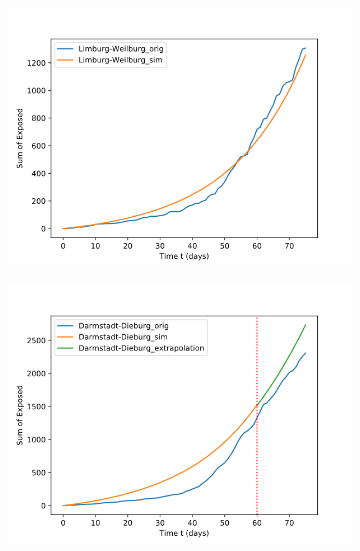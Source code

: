 \begin{figure}[h]
\begin{subfigure}[b]{0.3\textwidth}
		\includegraphics[width=\textwidth]{./figures/76d/10_Limburg-Weilburg.png}	
		\caption{}
	\end{subfigure}
	\begin{subfigure}[b]{0.3\textwidth}
		\centering
		\includegraphics[width=\textwidth]{./figures/60d/24_Darmstadt-Dieburg.png}	
		\caption{}
	\end{subfigure}
	\hfill
	\begin{subfigure}[b]{0.3\textwidth}
		\centering

\end{subfigure}
\end{figure}

